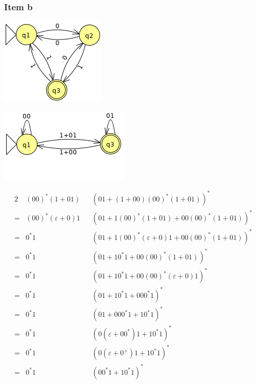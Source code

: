 {\subsubsection{Item b}
\begin{center}
\begin{minipage}{0.30\textwidth}
	\begin{center} \includegraphics[scale=0.5]{TP05_10_b_1} \end{center}
	\begin{center} \includegraphics[scale=0.5]{TP05_10_b_2} \end{center}
\end{minipage}%
\begin{minipage}{0.60\textwidth}
	\begin{alignat*}{2}
	 	 & (00)^*(1+01)           &&(01 + (1+00)(00)^*(1+01))^*\\
		=& (00)^*(\varepsilon+0)1 &&(01 + 1(00)^*(1+01)+00(00)^*(1+01))^*\\
		=& 0^*1                   &&(01 + 1(00)^*(\varepsilon+0)1+00(00)^*(1+01))^*\\
		=& 0^*1                   &&(01 + 10^*1+00(00)^*(1+01))^*\\
		=& 0^*1                   &&(01 + 10^*1+00(00)^*(\varepsilon+0)1)^*\\
		=& 0^*1                   &&(01 + 10^*1+000^*1)^*\\
		=& 0^*1                   &&(01 +000^*1 + 10^*1)^*\\
		=& 0^*1                   &&(0(\varepsilon +00^*)1 + 10^*1)^*\\
		=& 0^*1                   &&(0(\varepsilon +0^+)1 + 10^*1)^*\\
		=& 0^*1                   &&(00^*1 + 10^*1)^*\\

\end{alignat*}
\end{minipage}
\end{center}}
